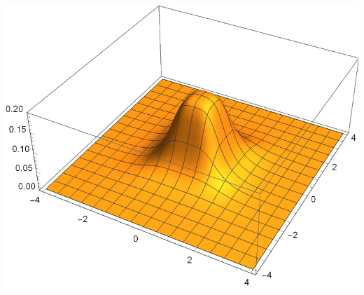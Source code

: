 \documentclass{tstextbook}
\begin{document}
\includegraphics[scale=0.7]{images/joint_probability_distribution.pdf}
\end{document}
